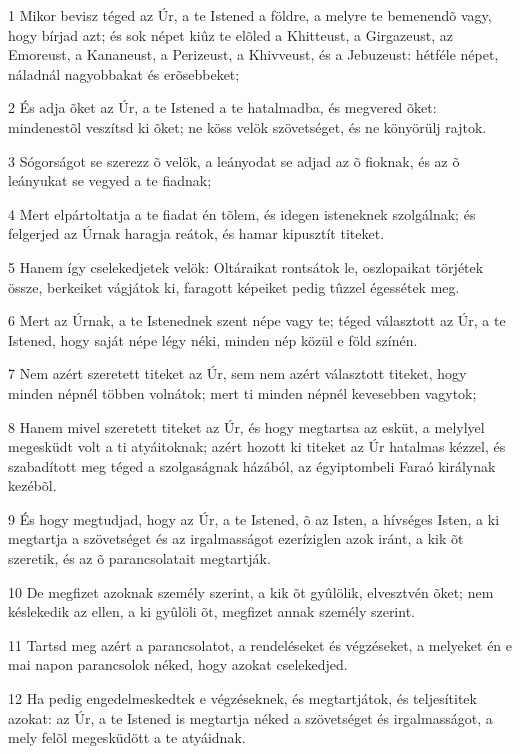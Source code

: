 \par 1 Mikor bevisz téged az Úr, a te Istened a földre, a melyre te bemenendõ vagy, hogy bírjad azt; és sok népet kiûz te elõled a Khitteust, a Girgazeust, az Emoreust, a Kananeust, a Perizeust, a Khivveust, és a Jebuzeust: hétféle népet, náladnál nagyobbakat és erõsebbeket;
\par 2 És adja õket az Úr, a te Istened a te hatalmadba, és megvered õket: mindenestõl veszítsd ki õket; ne köss velök szövetséget, és ne könyörülj rajtok.
\par 3 Sógorságot se szerezz õ velök, a leányodat se adjad az õ fioknak, és az õ leányukat se vegyed a te fiadnak;
\par 4 Mert elpártoltatja a te fiadat én tõlem, és idegen isteneknek szolgálnak; és felgerjed az Úrnak haragja reátok, és hamar kipusztít titeket.
\par 5 Hanem így cselekedjetek velök: Oltáraikat rontsátok le, oszlopaikat törjétek össze, berkeiket vágjátok ki, faragott képeiket pedig tûzzel égessétek meg.
\par 6 Mert az Úrnak, a te Istenednek szent népe vagy te; téged választott az Úr, a te Istened, hogy saját népe légy néki, minden nép közül e föld színén.
\par 7 Nem azért szeretett titeket az Úr, sem nem azért választott titeket, hogy minden népnél többen volnátok; mert ti minden népnél kevesebben vagytok;
\par 8 Hanem mivel szeretett titeket az Úr, és hogy megtartsa az esküt, a melylyel megesküdt volt a ti atyáitoknak; azért hozott ki titeket az Úr hatalmas kézzel, és szabadított meg téged a szolgaságnak házából, az égyiptombeli Faraó királynak kezébõl.
\par 9 És hogy megtudjad, hogy az Úr, a te Istened, õ az Isten, a hívséges Isten, a ki megtartja a szövetséget és az irgalmasságot ezeríziglen azok iránt, a kik õt szeretik, és az õ parancsolatait megtartják.
\par 10 De megfizet azoknak személy szerint, a kik õt gyûlölik, elvesztvén õket; nem késlekedik az ellen, a ki gyûlöli õt, megfizet annak személy szerint.
\par 11 Tartsd meg azért a parancsolatot, a rendeléseket és végzéseket, a melyeket én e mai napon parancsolok néked, hogy azokat cselekedjed.
\par 12 Ha pedig engedelmeskedtek e végzéseknek, és megtartjátok, és teljesítitek azokat: az Úr, a te Istened is megtartja néked a szövetséget és irgalmasságot, a mely felõl megesküdött a te atyáidnak.
